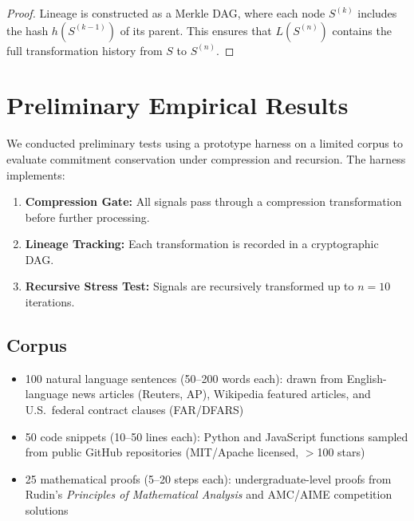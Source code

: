 \documentclass[11pt,a4paper]{article}
\begin{document}
\begin{proof}
Lineage is constructed as a Merkle DAG, where each node $S^{(k)}$ includes the hash $h(S^{(k-1)})$ of its parent. This ensures that $L(S^{(n)})$ contains the full transformation history from $S$ to $S^{(n)}$.
\end{proof}

\section{Preliminary Empirical Results}
\label{sec:empirical}

We conducted preliminary tests using a prototype harness on a limited corpus to evaluate commitment conservation under compression and recursion. The harness implements:

\begin{enumerate}
    \item \textbf{Compression Gate:} All signals pass through a compression transformation before further processing.
    \item \textbf{Lineage Tracking:} Each transformation is recorded in a cryptographic DAG.
    \item \textbf{Recursive Stress Test:} Signals are recursively transformed up to $n = 10$ iterations.
\end{enumerate}

\subsection{Corpus}

\begin{itemize}
    \item 100 natural language sentences (50--200 words each): drawn from English-language news articles (Reuters, AP), Wikipedia featured articles, and U.S.\ federal contract clauses (FAR/DFARS)
    \item 50 code snippets (10--50 lines each): Python and JavaScript functions sampled from public GitHub repositories (MIT/Apache licensed, $>$100 stars)
    \item 25 mathematical proofs (5--20 steps each): undergraduate-level proofs from Rudin's \textit{Principles of Mathematical Analysis} and AMC/AIME competition solutions
\end{itemize}
\end{document}
